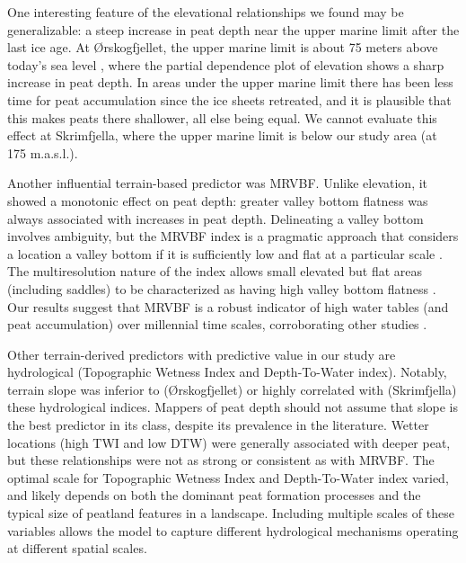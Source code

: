 \documentclass[soil, manuscript]{copernicus}
\begin{document}
One interesting feature of the elevational relationships we found may be generalizable: a steep increase in peat depth near the upper marine limit after the last ice age.
At Ørskogfjellet, the upper marine limit is about 75 meters above today's sea level \citep[Geological Survey of Norway,][]{hogaasDatabaseRegistreringAv2012}, where the partial dependence plot of elevation shows a sharp increase in peat depth.
In areas under the upper marine limit there has been less time for peat accumulation since the ice sheets retreated, and it is plausible that this makes peats there shallower, all else being equal.
We cannot evaluate this effect at Skrimfjella, where the upper marine limit is below our study area (at 175 m.a.s.l.).

Another influential terrain-based predictor was MRVBF.
Unlike elevation, it showed a monotonic effect on peat depth: greater valley bottom flatness was always associated with increases in peat depth.
Delineating a valley bottom involves ambiguity, but the MRVBF index is a pragmatic approach that considers a location a valley bottom if it is sufficiently low and flat at a particular scale \citep{gallantMultiresolutionIndexValley2003}.
The multiresolution nature of the index allows small elevated but flat areas (including saddles) to be characterized as having high valley bottom flatness \citep{gallantMultiresolutionIndexValley2003}.
Our results suggest that MRVBF is a robust indicator of high water tables (and peat accumulation) over millennial time scales, corroborating other studies \citep{rudiyantoOpenDigitalMapping2018, deragonMappingMaximumPeat2023}.

Other terrain-derived predictors with predictive value in our study are hydrological (Topographic Wetness Index and Depth-To-Water index).
Notably, terrain slope was inferior to (Ørskogfjellet) or highly correlated with (Skrimfjella) these hydrological indices.
Mappers of peat depth should not assume that slope is the best predictor in its class, despite its prevalence in the literature.
Wetter locations (high TWI and low DTW) were generally associated with deeper peat, but these relationships were not as strong or consistent as with MRVBF.
The optimal scale for Topographic Wetness Index and Depth-To-Water index varied, and likely depends on both the dominant peat formation processes and the typical size of peatland features in a landscape.
Including multiple scales of these variables allows the model to capture different hydrological mechanisms operating at different spatial scales.
\end{document}
